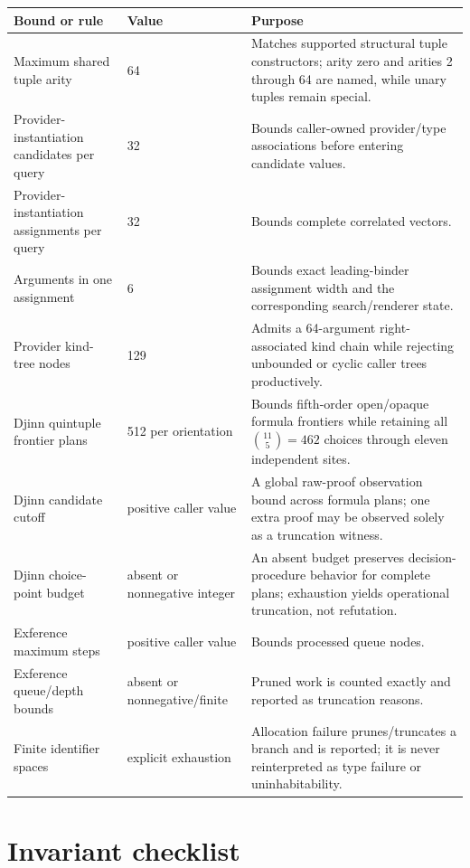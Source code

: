 \documentclass[10pt,letterpaper,oneside]{report}
\begin{document}
\begin{longtable}{@{}L{0.40\textwidth}L{0.15\textwidth}L{0.35\textwidth}@{}}
\toprule
\textbf{Bound or rule} & \textbf{Value} & \textbf{Purpose} \\
\midrule
\endhead
Maximum shared tuple arity & 64 & Matches supported structural tuple constructors; arity zero and arities 2 through 64 are named, while unary tuples remain special. \\
Provider-instantiation candidates per query & 32 & Bounds caller-owned provider/type associations before entering candidate values. \\
Provider-instantiation assignments per query & 32 & Bounds complete correlated vectors. \\
Arguments in one assignment & 6 & Bounds exact leading-binder assignment width and the corresponding search/renderer state. \\
Provider kind-tree nodes & 129 & Admits a 64-argument right-associated kind chain while rejecting unbounded or cyclic caller trees productively. \\
Djinn quintuple frontier plans & 512 per orientation & Bounds fifth-order open/opaque formula frontiers while retaining all \(\binom{11}{5}=462\) choices through eleven independent sites. \\
Djinn candidate cutoff & positive caller value & A global raw-proof observation bound across formula plans; one extra proof may be observed solely as a truncation witness. \\
Djinn choice-point budget & absent or nonnegative integer & An absent budget preserves decision-procedure behavior for complete plans; exhaustion yields operational truncation, not refutation. \\
Exference maximum steps & positive caller value & Bounds processed queue nodes. \\
Exference queue/depth bounds & absent or nonnegative/finite & Pruned work is counted exactly and reported as truncation reasons. \\
Finite identifier spaces & explicit exhaustion & Allocation failure prunes/truncates a branch and is reported; it is never reinterpreted as type failure or uninhabitability. \\
\bottomrule
\end{longtable}

\section{Invariant checklist}
\end{document}
